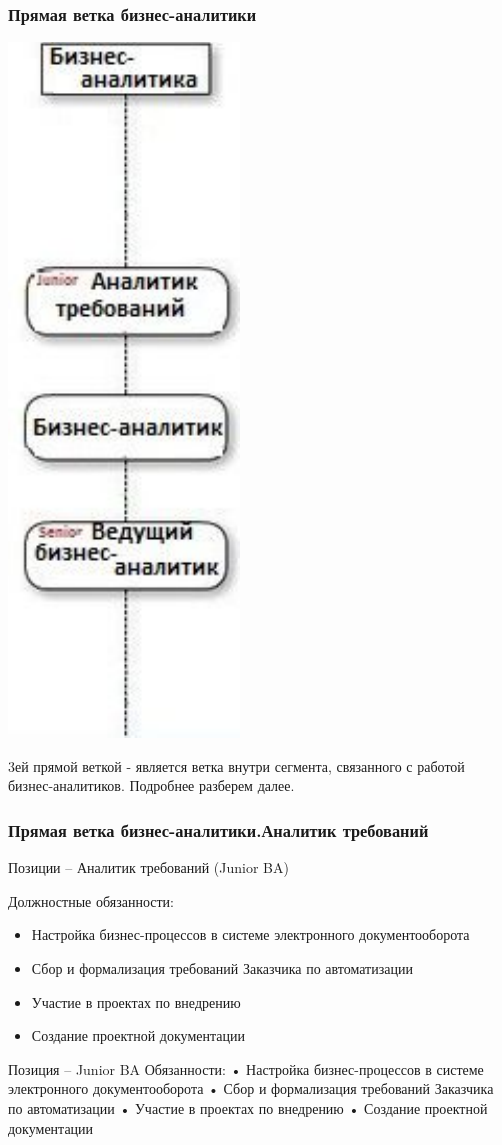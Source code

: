 \documentclass{../industrial-development}
\begin{document}
\begin{frame} \frametitle{Прямая ветка бизнес-аналитики }
  \centerline{\includegraphics[width=0.27\linewidth]{11-IT-specialist's-way/sch12c.pdf}}
\end{frame}

\lecturenotes
 3ей прямой веткой  - является ветка внутри сегмента, связанного с работой бизнес-аналитиков. Подробнее разберем далее.

\begin{frame} \frametitle{Прямая ветка бизнес-аналитики.Аналитик требований }
  \begin{block}{}
  \alert{Позиции – Аналитик требований (Junior  BA) }

Должностные обязанности: 
  \end{block}
  \begin{itemize}
  \item  Настройка бизнес-процессов в системе электронного документооборота 
  \item  Сбор и формализация требований Заказчика по автоматизации
  \item Участие в проектах по внедрению 
 \item Создание проектной документации
  \end{itemize}
\end{frame}


\lecturenotes
Позиция – Junior BA
Обязанности:
•	Настройка бизнес-процессов в системе электронного документооборота 
•	Сбор и формализация требований Заказчика по автоматизации 
•	Участие в проектах по внедрению 
•	Создание проектной документации
\end{document}
